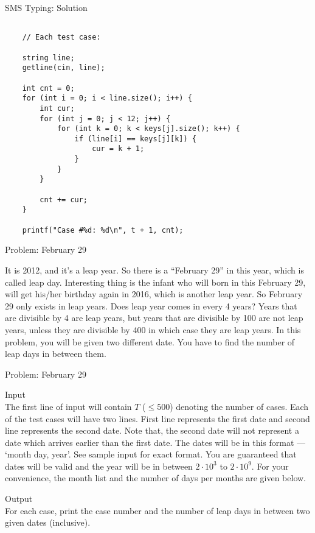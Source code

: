 \documentclass[12pt,t]{beamer}
\begin{document}
\begin{frame}[fragile]{SMS Typing: Solution}
    \begin{verbatim}

    // Each test case:

    string line;
    getline(cin, line);

    int cnt = 0;
    for (int i = 0; i < line.size(); i++) {
        int cur;
        for (int j = 0; j < 12; j++) {
            for (int k = 0; k < keys[j].size(); k++) {
                if (line[i] == keys[j][k]) {
                    cur = k + 1;
                }
            }
        }

        cnt += cur;
    }

    printf("Case #%d: %d\n", t + 1, cnt);
\end{verbatim}
\end{frame}


\begin{frame}{Problem: February 29}

\vspace{20pt}

{\small
   It is 2012, and it’s a leap year. So there is a “February 29” in this year, which is called leap day.
Interesting thing is the infant who will born in this February 29, will get his/her birthday again in
2016, which is another leap year. So February 29 only exists in leap years. Does leap year comes in
every 4 years? Years that are divisible by 4 are leap years, but years that are divisible by 100 are not
leap years, unless they are divisible by 400 in which case they are leap years.
In this problem, you will be given two different date. You have to find the number of leap days in
between them.
}
\end{frame}

\begin{frame}{Problem: February 29}

    \vspace{20pt}
    {\footnotesize\color{title} Input}\\
    {\small
The first line of input will contain $T$ ($\leq 500$) denoting the number of cases.
Each of the test cases will have two lines. First line represents the first date and second line
represents the second date. Note that, the second date will not represent a date which arrives earlier
than the first date. The dates will be in this format — ‘month day, year’. See sample input for exact
format. You are guaranteed that dates will be valid and the year will be in between $2 \cdot 10^3$ to $2 \cdot 10^9$.
For your convenience, the month list and the number of days per months are given below.
    }

    \vspace{20pt}
    {\footnotesize\color{title} Output}\\
    {\small
For each case, print the case number and the number of leap days in between two given dates (inclusive).
    }
\end{frame}
\end{document}
